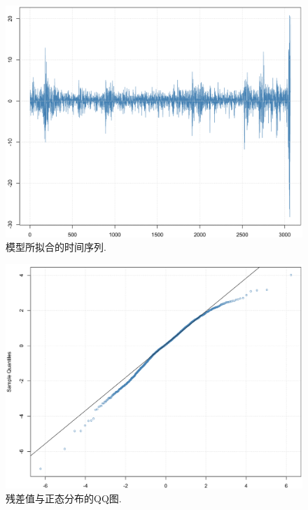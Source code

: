 \documentclass[12pt]{article}
\begin{document}
\begin{center}
    \hspace{30pt}\begin{minipage}{0.45\textwidth}
        \begin{figure}
            \centering
            \hspace{-25pt}\includegraphics[width=.9\textwidth]{output_44_0}
            \caption{模型所拟合的时间序列.\label{fig:15}}
        \end{figure}
    \end{minipage}
    \begin{minipage}{0.45\textwidth}
        \begin{figure}
            \centering
            \hspace{-25pt}\includegraphics[width=.9\textwidth]{output_45_0}
            \caption{残差值与正态分布的QQ图.\label{fig:16}}
        \end{figure}
    \end{minipage}
\end{center}
\end{document}
